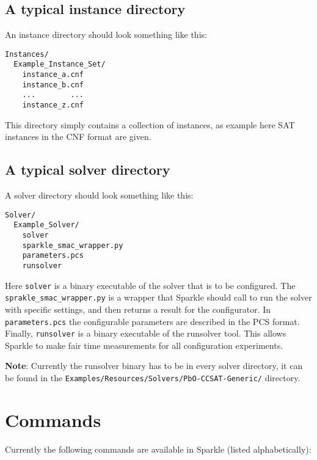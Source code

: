 \documentclass{article}
\begin{document}
\subsection{A typical instance directory}
\label{dir:instances}

An instance directory should look something like this:

\begin{verbatim}
Instances/
  Example_Instance_Set/
    instance_a.cnf
    instance_b.cnf
    ...        ...
    instance_z.cnf
\end{verbatim}

This directory simply contains a collection of instances, as example here SAT instances in the CNF format are given.

\subsection{A typical solver directory}
\label{dir:solvers}

A solver directory should look something like this:

\begin{verbatim}
Solver/
  Example_Solver/
    solver
    sparkle_smac_wrapper.py
    parameters.pcs
    runsolver
\end{verbatim}

Here \texttt{solver} is a binary executable of the solver that is to be configured. The \texttt{sprakle\_smac\_wrapper.py} is a wrapper that Sparkle should call to run the solver with specific settings, and then returns a result for the configurator. In \texttt{parameters.pcs} the configurable parameters are described in the PCS format. Finally, \texttt{runsolver} is a binary executable of the runsolver tool. This allows Sparkle to make fair time measurements for all configuration experiments.

\textbf{Note}: Currently the runsolver binary has to be in every solver directory, it can be found in the \texttt{Examples/Resources/Solvers/PbO-CCSAT-Generic/} directory. 

\section{Commands}

Currently the following commands are available in Sparkle (listed alphabetically):
\end{document}

